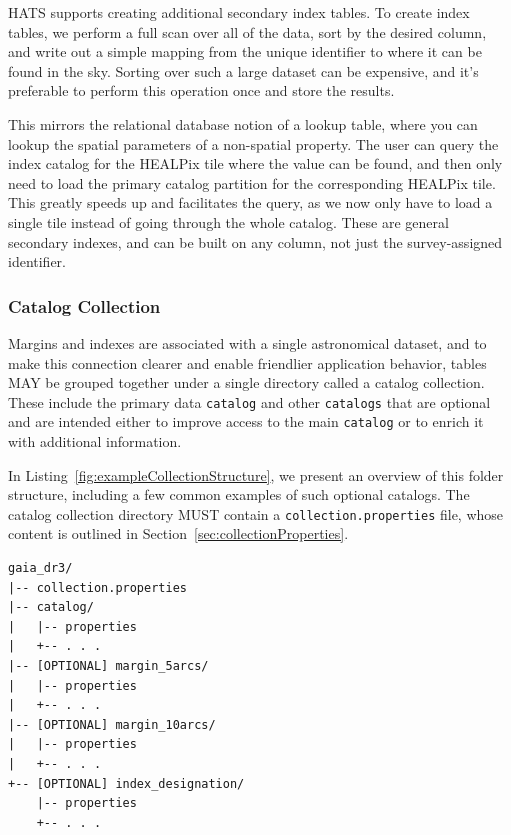 \documentclass[11pt,a4paper]{ivoa}
\begin{document}
HATS supports creating additional secondary index tables. 
To create index tables, we perform a full scan over all of the data, sort by the desired column, and write out a simple mapping from the unique identifier to where it can be found in the sky.
Sorting over such a large dataset can be expensive, and it's preferable to perform this operation once and store the results. \par

This mirrors the relational database notion of a lookup table, where you can lookup the spatial parameters of a non-spatial property.
The user can query the index catalog for the HEALPix tile where the value can be found, and then only need to load the primary catalog partition for the corresponding HEALPix tile. 
This greatly speeds up and facilitates the query, as we now only have to load a single tile instead of going through the whole catalog.
These are general secondary indexes, and can be built on any column, not just the survey-assigned identifier.

\subsubsection{Catalog Collection} \label{sec:collection}

Margins and indexes are associated with a single astronomical dataset, and to make this connection clearer and enable friendlier application behavior, tables MAY be grouped together under a single directory called a catalog collection.
These include the primary data \texttt{catalog} and other \texttt{catalogs} that are optional and are intended either to improve access to the main \texttt{catalog} or to enrich it with additional information. 

In Listing~\ref{fig:exampleCollectionStructure}, we present an overview of this folder structure, including a few common examples of such optional catalogs.
The catalog collection directory MUST contain a \texttt{collection.properties} file, whose content is outlined in Section~\ref{sec:collectionProperties}.

\begin{minipage}{\linewidth}
\begin{lstlisting}[caption=Example collection directory contents, label=fig:exampleCollectionStructure]
gaia_dr3/
|-- collection.properties
|-- catalog/
|   |-- properties
|   +-- . . .
|-- [OPTIONAL] margin_5arcs/
|   |-- properties
|   +-- . . .
|-- [OPTIONAL] margin_10arcs/
|   |-- properties
|   +-- . . .
+-- [OPTIONAL] index_designation/
    |-- properties
    +-- . . .
\end{lstlisting}
\end{minipage}
\end{document}
